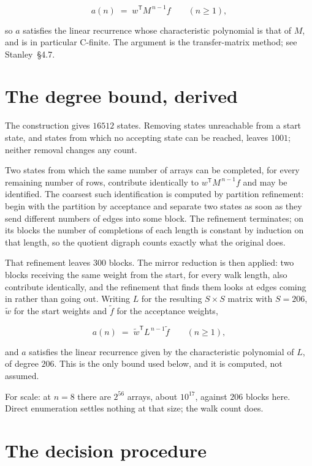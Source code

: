 \documentclass[11pt]{article}
\theoremstyle{definition}
\begin{document}
\[a(n) \;=\; w^{\mathsf T} M^{\,n-1} f \qquad (n \ge 1),\]

so $a$ satisfies the linear recurrence whose characteristic polynomial is that of $M$, and is in particular C-finite. The argument is the transfer-matrix method; see Stanley~\S4.7.

\section{The degree bound, derived}

The construction gives $16512$ states. Removing states unreachable from a start state, and states from which no accepting state can be reached, leaves $1001$; neither removal changes any count.

Two states from which the same number of arrays can be completed, for every remaining number of rows, contribute identically to $w^{\mathsf T}M^{\,n-1}f$ and may be identified. The coarsest such identification is computed by partition refinement: begin with the partition by acceptance and separate two states as soon as they send different numbers of edges into some block. The refinement terminates; on its blocks the number of completions of each length is constant by induction on that length, so the quotient digraph counts exactly what the original does.

That refinement leaves $300$ blocks. The mirror reduction is then applied: two blocks receiving the same weight from the start, for every walk length, also contribute identically, and the refinement that finds them looks at edges coming in rather than going out. Writing $L$ for the resulting $S \times S$ matrix with $S = 206$, $\tilde w$ for the start weights and $\tilde f$ for the acceptance weights,

\[a(n) \;=\; \tilde w^{\mathsf T} L^{\,n-1} \tilde f \qquad (n \ge 1),\]

and $a$ satisfies the linear recurrence given by the characteristic polynomial of $L$, of degree $206$. This is the only bound used below, and it is computed, not assumed.

For scale: at $n = 8$ there are $2^{56}$ arrays, about $10^{17}$, against $206$ blocks here. Direct enumeration settles nothing at that size; the walk count does.

\section{The decision procedure}
\end{document}
